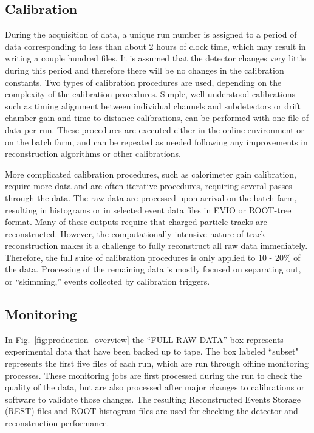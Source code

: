 \subsection{Calibration \label{sec:reccalibration}}
During the acquisition of data, a unique run number is assigned to a period of data corresponding to less than about 2 hours of clock time, which may result in writing a couple hundred files. It is assumed that the detector changes very little during this period and therefore there will be no changes in the calibration constants.
Two types of calibration procedures are used, depending on the complexity of the calibration procedures.  Simple, well-understood calibrations such as timing alignment between individual channels and subdetectors or drift chamber gain and time-to-distance calibrations, can be performed with one file of data per run.  These procedures are executed either in the online environment or on the batch farm, and can be repeated as needed following any improvements in reconstruction algorithms or other calibrations.

More complicated calibration procedures, such as calorimeter gain calibration, require more data and are often iterative procedures, requiring several passes through the data.  The raw data are processed upon arrival on the batch farm, resulting in histograms or in selected event data files in EVIO \cite{EVIO} or ROOT-tree format.
Many of these outputs require that charged particle tracks are reconstructed. However, the computationally intensive nature of track reconstruction makes it a challenge to fully reconstruct all raw data immediately. Therefore, the full suite of calibration procedures is only applied to 10 - 20\% of the data.
Processing of the remaining data is mostly focused on separating out, or ``skimming,'' events collected by calibration triggers. 


\subsection{Monitoring \label{sec:recmonitoring}}

In Fig.~\ref{fig:production_overview} the ``FULL  RAW DATA'' box represents experimental data that have been backed up to tape. The box labeled ``subset" represents the first five files of each run, which are run through offline monitoring processes. These monitoring jobs are first processed during the run to check the quality of the data, but are also processed after major changes to calibrations or software to validate those changes.
The resulting Reconstructed Events Storage (REST) files and ROOT histogram files are used for checking the detector and reconstruction performance.

